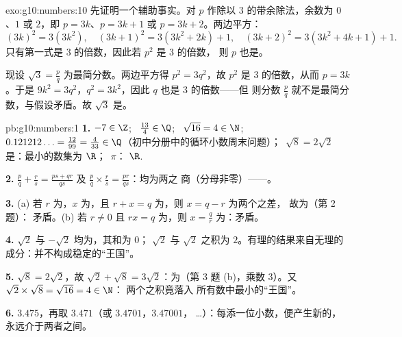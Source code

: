 \begin{solution}{exo:g10:numbers:10}
先证明一个辅助事实。对 $p$ 作除以 $3$ 的带余除法，余数为 $0$、$1$ 或
$2$，即 $p = 3k$、$p = 3k+1$ 或 $p = 3k+2$。两边平方：
\[
(3k)^2 = 3(3k^2), \quad
(3k+1)^2 = 3(3k^2 + 2k) + 1, \quad
(3k+2)^2 = 3(3k^2 + 4k + 1) + 1 .
\]
只有第一式是 $3$ 的倍数，因此若 $p^2$ 是 $3$ 的倍数，
则 $p$ 也是。

现设 $\sqrt3 = \frac pq$ 为最简分数。两边平方得
$p^2 = 3q^2$，故 $p^2$ 是 $3$ 的倍数，从而 $p = 3k$。于是
$9k^2 = 3q^2$，$q^2 = 3k^2$，因此 $q$ 也是 $3$ 的倍数——但
则分数 $\frac pq$ 就不是最简分数，与假设矛盾。故
$\sqrt3$ 是。
\end{solution}

\begin{solution}{pb:g10:numbers:1}
\textbf{1.} $-7 \in \Z$; \ $\frac{13}{4} \in \Q$; \
$\sqrt{16} = 4 \in \N$; \ $0.121212\ldots = \frac{12}{99} =
\frac{4}{33} \in \Q$（初中分册中的循环小数周末问题）；\
$\sqrt8 = 2\sqrt2$ 是：最小的数集为 $\R$；\ $\pi$：
$\R$.

\textbf{2.} $\frac pq + \frac rs = \frac{ps + qr}{qs}$ 及
$\frac pq \times \frac rs = \frac{pr}{qs}$：均为两之
商（分母非零）——。

\textbf{3.} (a) 若 $r$ 为，$x$ 为，且
$r + x = q$ 为，则 $x = q - r$ 为两个之差，
故为（第 2 题）：
矛盾。(b) 若 $r \neq 0$ 且 $r x = q$ 为\omterm{def:g10:numbers:sets}{有理数}，则
$x = \frac qr$ 为\omterm{def:g10:numbers:sets}{有理数}：矛盾。

\textbf{4.} $\sqrt2$ 与 $-\sqrt2$ 均为，其和为 $0$；
$\sqrt2$ 与 $\sqrt2$ 之积为 $2$。有理的结果来自无理的
成分：\omterm{ex:g10:numbers:classify}{无理数}并不构成稳定的“王国”。

\textbf{5.} $\sqrt8 = 2\sqrt2$，故
$\sqrt2 + \sqrt8 = 3\sqrt2$：为（第 3 题 (b)，乘数
$3$）。又 $\sqrt2 \times \sqrt8 = \sqrt{16} = 4 \in \N$：
两个\omterm{ex:g10:numbers:classify}{无理数}之积竟落入
所有数中最小的“王国”。

\textbf{6.} $3.475$，再取 $3.471$（或 $3.4701$，$3.47001$，
\dots）：每添一位小数，便产生新的，
永远介于两者之间。


\end{solution}
